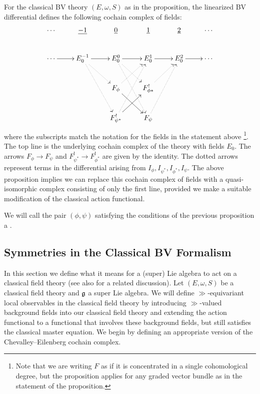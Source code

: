 \documentclass[10pt, oneside]{article}
\begin{document}
\begin{remark}
For the classical BV theory $(E, \omega, S)$ as in the proposition, the linearized BV differential defines the following cochain complex of fields:
\[\xymatrix{
\cdots & \ul{-1} & \ul{0} & \ul{1} & \ul{2} & \cdots \\
\cdots \ar[r] & E_0^{-1}\ar[r] \ar@{.>}[dr] \ar@{.>}[ddr] &E_0^0 \ar@{.>}[ddr] \ar@{.>}[dr]  \ar[r]  &E_0^1 \ar[r] &E_0^2 \ar[r] &\cdots \\
&&F_\phi \ar^{~}[dr]  \ar@{.>}[ur] &F^!_{\phi*}  \ar@{.>}[ur] && \\
&&F^!_{\psi^*} \ar^{~}[ur]  \ar@{.>}[uur]  &F_\psi  \ar@{.>}[uur] && \\
}\]
where the subscripts match the notation for the fields in the statement above \footnote{Note that we are writing $F$ as if it is concentrated in a single cohomological degree, but the proposition applies for any graded vector bundle as in the statement of the proposition.}.  The top line is the underlying cochain complex of the theory with fields $E_0$. The arrows $F_\phi \to F_\psi$ and $F^!_{\psi^*} \to F^!_{\phi^*}$ are given by the identity. The dotted arrows represent terms in the differential arising from $I_\phi, I_{\psi^*}, I_{\phi^*}, I_{\psi}$. The above proposition implies we can replace this cochain complex of fields with a quasi-isomorphic complex consisting of only the first line, provided we make a suitable modification of the classical action functional. 
\end{remark}
\begin{remark}
We will call the pair $(\phi, \psi)$ satisfying the conditions of the previous proposition a .
\end{remark}

\subsection{Symmetries in the Classical BV Formalism} \label{symmetry_section}
In this section we define what it means for a (super) Lie algebra to act on a classical field theory  (see also \cite[Chapter 11]{Book2} for a related discussion). Let $(E, \omega, S)$ be a classical field theory and $\mathfrak g$ a super Lie algebra.  We will define $\gg$-equivariant local observables in the classical field theory by introducing $\gg$-valued background fields into our classical field theory and extending the action functional to a functional that involves these background fields, but still satisfies the classical master equation.  We begin by defining an appropriate version of the Chevalley--Eilenberg cochain complex.
\end{document}
